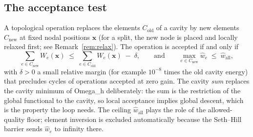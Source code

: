 \documentclass[11pt]{article}
\newcommand{\bs}[1]{\boldsymbol{#1}}
\newcommand{\omegah}{Omega\_h}
\begin{document}
\subsection{The acceptance test}

A topological operation replaces the elements $C_{\text{old}}$ of a
cavity by new elements $C_{\text{new}}$ at fixed nodal positions
$\bs{x}$ (for a split, the new node is placed and locally relaxed first;
see Remark~\ref{rem:relax}). The operation is accepted if and only if
\begin{equation}
\sum_{e \in C_{\text{new}}} W_e(\bs{x})
\;\leq\;
\sum_{e \in C_{\text{old}}} W_e(\bs{x}) \;-\; \delta,
\qquad\text{and}\qquad
\max_{e \in C_{\text{new}}} \hat{w}_e \;\leq\; \hat{w}_{\text{all}},
\label{eq:acceptance}
\end{equation}
with $\delta > 0$ a small relative margin (for example $10^{-8}$ times
the old cavity energy) that precludes cycles of operations accepted at
zero gain. The cavity \emph{sum} replaces the cavity minimum of
\omegah{} deliberately: the sum is the restriction of the global
functional to the cavity, so local acceptance implies global descent,
which is the property the loop needs. The ceiling
$\hat{w}_{\text{all}}$ plays the role of the allowed-quality floor;
element inversion is excluded automatically because the Seth--Hill
barrier sends $\hat{w}_e$ to infinity there.
\end{document}
